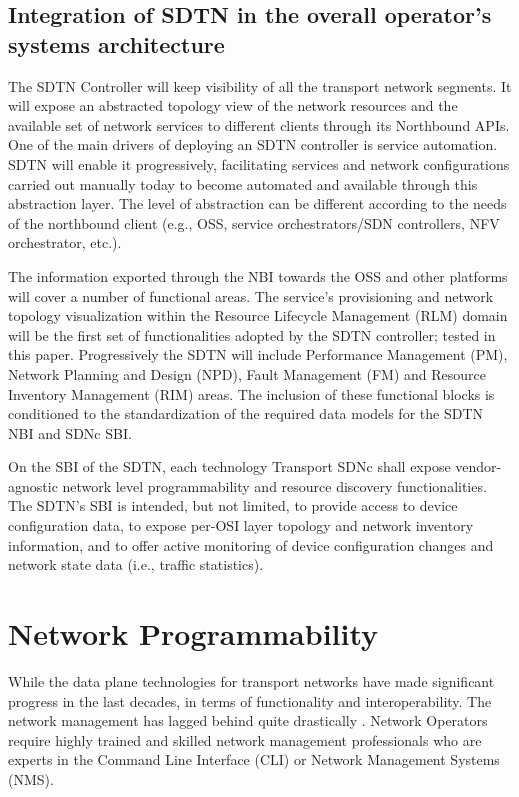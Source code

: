 \documentclass[a4paper,fleqn]{cas-dc}
\begin{document}
\subsection{Integration of SDTN in the overall operator’s systems architecture}
\label{section:sdtn}
The SDTN Controller will keep visibility of all the transport network segments. It will expose an abstracted topology view of the network resources and the available set of network services to different clients through its Northbound APIs.  
One of the main drivers of deploying an SDTN controller is service automation. SDTN will enable it progressively, facilitating services and network configurations carried out manually today to become automated and available through this abstraction layer.  The level of abstraction can be different according to the needs of the northbound client (e.g., OSS, service orchestrators/SDN controllers, NFV orchestrator, etc.). 

The information exported through the NBI towards the OSS and other platforms will cover a number of functional areas. The service’s provisioning and network topology visualization within the Resource Lifecycle Management (RLM) domain will be the first set of functionalities adopted by the SDTN controller; tested in this paper. Progressively the SDTN will include Performance Management (PM), Network Planning and Design (NPD), Fault Management (FM) and Resource Inventory Management (RIM) areas. The inclusion of these functional blocks is conditioned to the standardization of the required data models for the SDTN NBI and SDNc SBI.

On the SBI of the SDTN, each technology Transport SDNc shall expose vendor-agnostic network level programmability and resource discovery functionalities. The SDTN's SBI is intended, but not limited, to provide access to device configuration data, to expose per-OSI layer topology and network inventory information, and to offer active monitoring of device configuration changes and network state data (i.e., traffic statistics). 

\section{Network Programmability}
\label{section:net}

While the data plane technologies for transport networks have made significant progress in the last decades, in terms of functionality and interoperability. The network management has lagged behind quite drastically \cite{claise2019network,edelman2018network}. Network Operators require highly trained and skilled network management professionals who are experts in the Command Line Interface (CLI) or Network Management Systems (NMS). 
\end{document}

